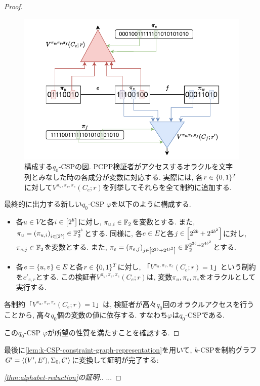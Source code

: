 \begin{proof}
  \begin{figure}[ht]
    \centering
    \includegraphics[width=\textwidth]{images/newCSP2.pdf}
    \caption{構成する$q_0$-CSPの図. PCPP検証者がアクセスするオラクルを文字列とみなした時の各成分が変数に対応する. 実際には, 各$r\in\{0,1\}^T$に対して$V^{\pi_u,\pi_v,\pi_e}(C_e;r)$を列挙してそれらを全て制約に追加する. \label{fig:newCSP2}}
  \end{figure}
  
  最終的に出力する新しい$q_0$-CSP $\varphi$を以下のように構成する.
  \begin{itemize}
    \item 各$u\in V$と各$i\in \qty[2^b]$に対し, $\pi_{u,i}\in\mathbb{F}_2$を変数とする. また, $\pi_u=\qty(\pi_{u,i})_{i\in[2^b]}\in \mathbb{F}_2^{2^b}$とする. 同様に, 各$e\in E$と各$j\in \qty[ 2^{2b} + 2^{4b^2} ]$に対し, $\pi_{e,j}\in\mathbb{F}_2$を変数とする. また, $\pi_e=\qty(\pi_{e,j})_{j\in\qty[2^{2b} + 2^{4b^2}]}\in \mathbb{F}_2^{2^{2b} + 2^{4b^2}}$とする.
    \item 各$e=\qty{u,v}\in E$と各$r\in\{0,1\}^{T}$に対し, 「$V^{\pi_u,\pi_v,\pi_e}(C_e;r)=1$」という制約を$c'_{e,r}$とする. この検証者$V^{\pi_u,\pi_v,\pi_e}(C_e;r)$は, 変数$\pi_u,\pi_v,\pi_e$をオラクルとして実行する.
  \end{itemize}
  各制約「$V^{\pi_u,\pi_v,\pi_e}(C_e;r)=1$」は, 検証者が高々$q_0$回のオラクルアクセスを行うことから, 高々$q_0$個の変数の値に依存する. すなわち$\varphi$は$q_0$-CSPである.

  この$q_0$-CSP $\varphi$が所望の性質を満たすことを確認する.

\end{proof}

最後に\cref{lem:k-CSP-constraint-graph-representation}を用いて, $k$-CSPを制約グラフ$G'=\langle(V',E'),\Sigma_0,\mathcal{C}'\rangle$に変換して証明が完了する:
\begin{proof}[\cref{thm:alphabet-reduction}の証明.]
  ...
\end{proof}

